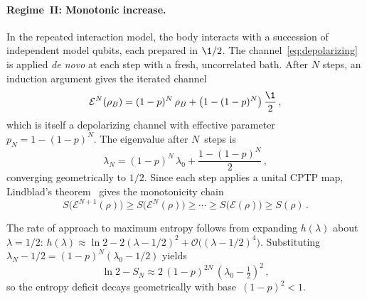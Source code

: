 \paragraph{Regime~II: Monotonic increase.}
In the repeated interaction model, the body interacts with a
succession of independent model qubits, each prepared in $\1/2$.
The channel~\eqref{eq:depolarizing} is applied \emph{de novo} at
each step with a fresh, uncorrelated bath.  After $N$ steps, an
induction argument gives the iterated channel
\begin{equation}
  \mathcal{E}^N(\rho_B)
  = (1-p)^N\,\rho_B + \bigl(1 - (1-p)^N\bigr)\,\frac{\1}{2} \,,
  \label{eq:iterated}
\end{equation}
which is itself a depolarizing channel with effective parameter
$p_N = 1 - (1-p)^N$.  The eigenvalue after $N$~steps is
\begin{equation}
  \lambda_N = (1-p)^N\,\lambda_0
    + \frac{1 - (1-p)^N}{2} \,,
  \label{eq:eigenvalue-N}
\end{equation}
converging geometrically to $1/2$.  Since each step applies a
unital CPTP map, Lindblad's theorem~\cite{Lindblad1975} gives the
monotonicity chain
\begin{equation}
  S\bigl(\mathcal{E}^{N+1}(\rho)\bigr)
  \geq S\bigl(\mathcal{E}^{N}(\rho)\bigr)
  \geq \cdots
  \geq S\bigl(\mathcal{E}(\rho)\bigr)
  \geq S(\rho) \,.
  \label{eq:monotonicity}
\end{equation}

The rate of approach to maximum entropy follows from expanding
$h(\lambda)$ about $\lambda = 1/2$:
$h(\lambda) \approx \ln 2 - 2(\lambda - 1/2)^2
+ \mathcal{O}\bigl((\lambda - 1/2)^4\bigr)$.
Substituting $\lambda_N - 1/2 = (1-p)^N(\lambda_0 - 1/2)$ yields
\begin{equation}
  \ln 2 - S_N \approx 2\,(1-p)^{2N}\,
    (\lambda_0 - \tfrac{1}{2})^2 \,,
  \label{eq:convergence}
\end{equation}
so the entropy deficit decays geometrically with
base~$(1-p)^2 < 1$.

